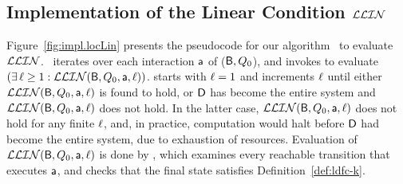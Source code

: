 






   \subsection{Implementation of the Linear Condition $\mathcal{LLIN}$}
   \label{s:implLin}
%   
  



Figure~\ref{fig:impl.locLin} presents the pseudocode for our algorithm
\ to evaluate $\mathcal{LLIN}$.
%
\ iterates over each interaction $\mathsf{a}$ of ($\mathsf{B},Q_0$), and 
invokes  to evaluate $(\exists\, \ell \ge 1: \mathcal{LLIN}(\mathsf{B}, Q_0, \mathsf{a}, \ell))$.
starts with $\ell=1$ and increments $\ell$ until either $\mathcal{LLIN}(\mathsf{B}, Q_0, \mathsf{a}, \ell)$ is found to hold, or
$\mathsf{D}$ has become the entire system and $\mathcal{LLIN}(\mathsf{B}, Q_0, \mathsf{a}, \ell)$ does not hold. In the
latter case, $\mathcal{LLIN}(\mathsf{B}, Q_0, \mathsf{a}, \ell)$ does not hold for any finite $\ell$, and, in practice,
computation would halt before $\mathsf{D}$ had become the entire system, due to exhaustion of
resources. Evaluation of $\mathcal{LLIN}(\mathsf{B}, Q_0, \mathsf{a}, \ell)$ is done by 
, which examines every reachable transition
that executes $\mathsf{a}$, and checks that the final state satisfies
Definition~\ref{def:ldfc-k}. 

